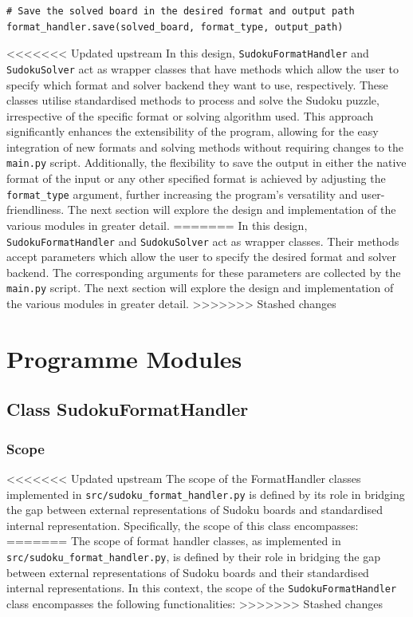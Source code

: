 \documentclass[11pt]{article}
\begin{document}
\begin{itemize}
\begin{verbatim}
# Save the solved board in the desired format and output path
format_handler.save(solved_board, format_type, output_path)
\end{verbatim}

<<<<<<< Updated upstream
In this design, \texttt{SudokuFormatHandler} and \texttt{SudokuSolver} act as wrapper classes that have methods which allow the user to specify which format and solver backend they want to use, respectively. These classes utilise standardised methods to process and solve the Sudoku puzzle, irrespective of the specific format or solving algorithm used. This approach significantly enhances the extensibility of the program, allowing for the easy integration of new formats and solving methods without requiring changes to the \texttt{main.py} script. Additionally, the flexibility to save the output in either the native format of the input or any other specified format is achieved by adjusting the \texttt{format\_type} argument, further increasing the program's versatility and user-friendliness. The next section will explore the design and implementation of the various modules in greater detail.
=======
In this design, \texttt{SudokuFormatHandler} and \texttt{SudokuSolver} act as wrapper classes. Their methods accept parameters which allow the user to specify the desired format and solver backend. The corresponding arguments for these parameters are collected by the \texttt{main.py} script. The next section will explore the design and implementation of the various modules in greater detail.
>>>>>>> Stashed changes

\section{Programme Modules}
\subsection{Class SudokuFormatHandler}

\subsubsection{Scope}
<<<<<<< Updated upstream
The scope of the FormatHandler classes implemented in \texttt{src/sudoku\_format\_handler.py} is defined by its role in bridging the gap between external representations of Sudoku boards and standardised internal representation. Specifically, the scope of this class encompasses:
=======
The scope of format handler classes, as implemented in \texttt{src/sudoku\_format\_handler.py}, is defined by their role in bridging the gap between external representations of Sudoku boards and their standardised internal representations. In this context, the scope of the \texttt{SudokuFormatHandler} class encompasses the following functionalities:
>>>>>>> Stashed changes


\end{itemize}
\end{document}
